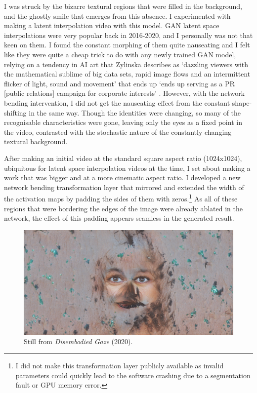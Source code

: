 I was struck by the bizarre textural regions that were filled in the background, and the ghostly smile that emerges from this absence. 
I experimented with making a latent interpolation video with this model. GAN latent space interpolations were very popular back in 2016-2020, and I personally was not that keen on them.
I found the constant morphing of them quite nauseating and I felt like they were quite a cheap trick to do with any newly trained GAN model, relying on a tendency in AI art that Zylinska describes as `dazzling viewers with the mathematical sublime of big data sets, rapid image flows and an intermittent flicker of light, sound and movement' that ends up `ends up serving as a PR [public relations] campaign for corporate interests' \citeyearpar{zylinska2020ai}. 
However, with the network bending intervention, I did not get the nauseating effect from the constant shape-shifting in the same way. 
Though the identities were changing, so many of the recognisable characteristics were gone, leaving only the eyes as a fixed point in the video, contrasted with the stochastic nature of the constantly changing textural background. 

After making an initial video at the standard square aspect ratio (1024x1024), ubiquitous for latent space interpolation videos at the time, I set about making a work that was bigger and at a more cinematic aspect ratio. 
I developed a new network bending transformation layer that mirrored and extended the width of the activation maps by padding the sides of them with zeros.\footnote{
    I did not make this transformation layer publicly available as invalid parameters could quickly lead to the software crashing due to a segmentation fault or GPU memory error.
}
As all of these regions that were bordering the edges of the image were already ablated in the network, the effect of this padding appears seamless in the generated result. 

\begin{figure}[!htb]
    \centering
    \captionsetup{justification=centering}
    \includegraphics[width=1\textwidth]{figures/c7_impact/disembodied_gaze.png}
    \caption{Still from \textit{Disembodied Gaze} (2020).}
    \label{fig:c7:disembodied-gaze-wide}
\end{figure}

